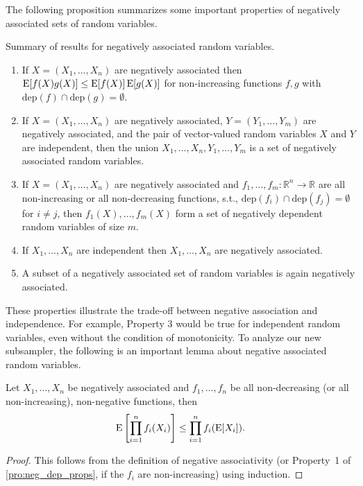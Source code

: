 The following proposition summarizes some important properties of negatively associated sets of random variables.
\begin{proposition}\label{pro:neg_dep_props}
Summary of results for negatively associated random variables.
\begin{enumerate}
\item \label{it:neg_dep_props:mult_mono} If $X=(X_1,\ldots,X_n)$ are negatively associated then $\operatorname{\mathrm{E}} [f(X) g(X)] \leq \operatorname{\mathrm{E}} [f(X)] \operatorname{\mathrm{E}} [g(X)]$ for non-increasing functions $f,g$ with $\mathrm{dep}(f) \cap \mathrm{dep}(g) = \emptyset$.
\item If $X=(X_1,\ldots,X_n)$ are negatively associated, $Y=(Y_1,\ldots,Y_m)$ are negatively associated, and the pair of vector-valued random variables $X$ and $Y$ are independent, then the union $X_1,\dots,X_n,Y_1,\dots,Y_m$ is a set of negatively associated random variables.
\item If $X=(X_1,\ldots,X_n)$ are negatively associated and $f_1, \dots ,f_m : \mathbb R^n \rightarrow \mathbb R$ are all non-increasing or all non-decreasing functions, s.t., $\mathrm{dep}(f_i) \cap \mathrm{dep}(f_j) = \emptyset$ for $i \neq j$, then $f_1(X),\ldots,f_m(X)$ form a set of negatively dependent random variables of size $m$.
\item If $X_1,\dots,X_n$ are independent then $X_1,\dots,X_n$ are negatively associated.
\item A subset of a negatively associated set of random variables is again negatively associated.
\end{enumerate}
\end{proposition}

These properties illustrate the trade-off between negative association and independence.
For example, Property 3 would be true for independent random variables, even without the condition of monotonicity.
To analyze our new subsampler, the following is an important lemma about negative associated random variables.

\begin{lemma}\label{le:neg_assoc_prod}
Let $X_1,\dots,X_n$ be negatively associated and $f_1,\dots,f_n$ be all non-decreasing (or all non-increasing), non-negative functions, then
\[
  \operatorname{\mathrm{E}} \left[\prod_{i=1}^{n} f_i(X_i)\right] \leq \prod_{i=1}^{n} f_i(\operatorname{\mathrm{E}} [X_i]) \textrm{.}
\]
\end{lemma}
\begin{proof}
This follows from the definition of negative associativity (or Property~1 of \cref{pro:neg_dep_props}, if the $f_i$ are non-increasing) using induction.
\end{proof}

